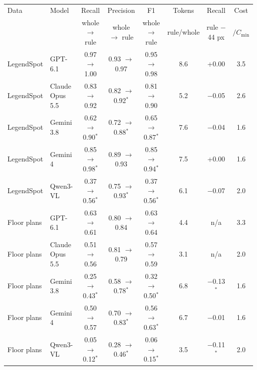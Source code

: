 \begin{tabular}{llcccccc}
\toprule
Data & Model & Recall & Precision & F1 & Tokens & Recall & Cost \\
 & & whole $\to$ rule & whole $\to$ rule & whole $\to$ rule & rule/whole & rule $-$ 44 px & $/C_{\min}$ \\
\midrule
LegendSpot & GPT-6.1 & 0.97 $\to$ 1.00 & 0.93 $\to$ 0.97 & 0.95 $\to$ 0.98 & 8.6 & +0.00 & 3.5 \\
LegendSpot & Claude Opus 5.5 & 0.83 $\to$ 0.92 & 0.82 $\to$ 0.92$^{*}$ & 0.81 $\to$ 0.90 & 5.2 & $-$0.05 & 2.6 \\
LegendSpot & Gemini 3.8 & 0.62 $\to$ 0.90$^{*}$ & 0.72 $\to$ 0.88$^{*}$ & 0.65 $\to$ 0.87$^{*}$ & 7.6 & $-$0.04 & 1.6 \\
LegendSpot & Gemini 4 & 0.85 $\to$ 0.98$^{*}$ & 0.89 $\to$ 0.93 & 0.85 $\to$ 0.94$^{*}$ & 7.5 & +0.00 & 1.6 \\
LegendSpot & Qwen3-VL & 0.37 $\to$ 0.56$^{*}$ & 0.75 $\to$ 0.93$^{*}$ & 0.37 $\to$ 0.56$^{*}$ & 6.1 & $-$0.07 & 2.0 \\
\midrule
Floor plans & GPT-6.1 & 0.63 $\to$ 0.61 & 0.80 $\to$ 0.84 & 0.63 $\to$ 0.64 & 4.4 & n/a & 3.3 \\
Floor plans & Claude Opus 5.5 & 0.51 $\to$ 0.56 & 0.81 $\to$ 0.79 & 0.57 $\to$ 0.59 & 3.1 & n/a & 2.0 \\
Floor plans & Gemini 3.8 & 0.25 $\to$ 0.43$^{*}$ & 0.58 $\to$ 0.78$^{*}$ & 0.32 $\to$ 0.50$^{*}$ & 6.8 & $-$0.13$^{*}$ & 1.6 \\
Floor plans & Gemini 4 & 0.50 $\to$ 0.57 & 0.70 $\to$ 0.83$^{*}$ & 0.56 $\to$ 0.63$^{*}$ & 6.7 & $-$0.01 & 1.6 \\
Floor plans & Qwen3-VL & 0.05 $\to$ 0.12$^{*}$ & 0.28 $\to$ 0.46$^{*}$ & 0.06 $\to$ 0.15$^{*}$ & 3.5 & $-$0.11$^{*}$ & 2.0 \\
\bottomrule
\end{tabular}
